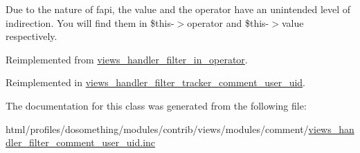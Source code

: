 Due to the nature of fapi, the value and the operator have an unintended level of indirection. You will find them in \$this-\/$>$operator and \$this-\/$>$value respectively. 

Reimplemented from \hyperlink{classviews__handler__filter__in__operator_af4b9a596ad1e6fbee116977ca0a7d8a9}{views\_\-handler\_\-filter\_\-in\_\-operator}.

Reimplemented in \hyperlink{classviews__handler__filter__tracker__comment__user__uid_a95b14e84882db3a1911c885c606e8835}{views\_\-handler\_\-filter\_\-tracker\_\-comment\_\-user\_\-uid}.

The documentation for this class was generated from the following file:\begin{DoxyCompactItemize}
\item 
html/profiles/dosomething/modules/contrib/views/modules/comment/\hyperlink{views__handler__filter__comment__user__uid_8inc}{views\_\-handler\_\-filter\_\-comment\_\-user\_\-uid.inc}\end{DoxyCompactItemize}
